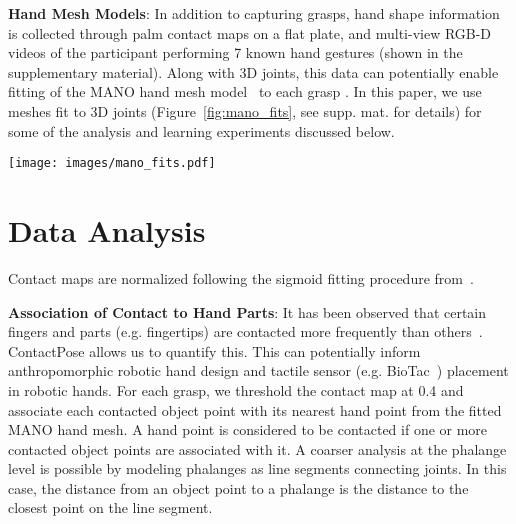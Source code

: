 \documentclass[runningheads]{llncs}
\begin{document}
\noindent\textbf{Hand Mesh Models}: In addition to capturing grasps, hand shape information is collected through palm contact maps on a flat plate, and multi-view RGB-D videos of the participant performing 7 known hand gestures (shown in the supplementary material). Along with 3D joints, this data can potentially enable fitting of the MANO hand mesh model~\cite{romero2017embodied} to each grasp \cite{moon2018v2v}. In this paper, we use meshes fit to 3D joints (Figure~\ref{fig:mano_fits}, see supp. mat. for details) for some of the analysis and learning experiments discussed below.

\begin{figure*}
 \texttt{[image: images/mano\_fits.pdf]}
 \caption{MANO hand meshes~\cite{romero2017embodied} fit to ContactPose data. Both hand pose and shape parameters are optimized to minimize the distance of MANO joints from ContactPose 3D joint annotations.}
 \label{fig:mano_fits}
\end{figure*}



%
 \section{Data Analysis} \label{sec:analysis}
Contact maps are  normalized following the sigmoid fitting procedure from~\cite{contactdbv1}.

\noindent\textbf{Association of Contact to Hand Parts}: It has been observed that certain fingers and parts (e.g. fingertips) are contacted more frequently than others~\cite{bullock2015yale, bullock2013grasp}. ContactPose allows us to quantify this. This can potentially inform anthropomorphic robotic hand design and tactile sensor (e.g. BioTac~\cite{biotac}) placement in robotic hands. For each grasp, we threshold the contact map at 0.4 and associate each contacted object point with its nearest hand point from the fitted MANO hand mesh. A hand point is considered to be contacted if one or more contacted object points are associated with it. A coarser analysis at the phalange level is possible by modeling phalanges as line segments connecting joints. In this case, the distance from an object point to a phalange is the distance to the closest point on the line segment.
\end{document}
